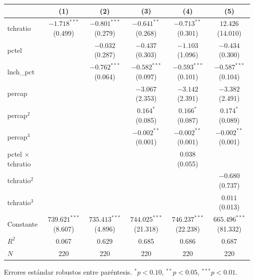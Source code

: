 
\begin{tabular}{lccccc}
\toprule
 & (1) & (2) & (3) & (4) & (5)\\
\midrule
tchratio & $-1.718^{***}$ (0.499) & $-0.801^{***}$ (0.279) & $-0.641^{**}$ (0.268) & $-0.713^{**}$ (0.301) & $12.426$ (14.010)\\
pctel &  & $-0.032$ (0.287) & $-0.437$ (0.303) & $-1.103$ (1.096) & $-0.434$ (0.300)\\
lnch\_pct &  & $-0.762^{***}$ (0.064) & $-0.582^{***}$ (0.097) & $-0.593^{***}$ (0.101) & $-0.587^{***}$ (0.104)\\
percap &  &  & $-3.067$ (2.353) & $-3.142$ (2.391) & $-3.382$ (2.491)\\
percap$^2$ &  &  & $0.164^{*}$ (0.085) & $0.166^{*}$ (0.087) & $0.174^{*}$ (0.089)\\
percap$^3$ &  &  & $-0.002^{**}$ (0.001) & $-0.002^{**}$ (0.001) & $-0.002^{**}$ (0.001)\\
pctel $\times$ tchratio &  &  &  & $0.038$ (0.055) & \\
tchratio$^2$ &  &  &  &  & $-0.680$ (0.737)\\
tchratio$^3$ &  &  &  &  & $0.011$ (0.013)\\
Constante & $739.621^{***}$ (8.607) & $735.413^{***}$ (4.896) & $744.025^{***}$ (21.318) & $746.237^{***}$ (22.238) & $665.496^{***}$ (81.332)\\
$R^2$ & 0.067 & 0.629 & 0.685 & 0.686 & 0.687\\
$N$ & 220 & 220 & 220 & 220 & 220\\
\bottomrule
\end{tabular}
\par\vspace{3pt}
{\footnotesize\parbox{0.9\linewidth}{\centering Errores est\'andar robustos entre par\'entesis. $^{*}p<0.10$, $^{**}p<0.05$, $^{***}p<0.01$.}}
